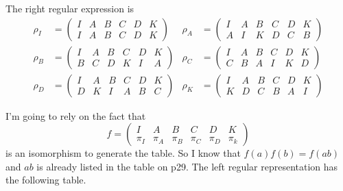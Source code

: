 \documentclass[twoside]{amsart}
\begin{document}
\begin{enumerate}[A.]
\begin{enumerate}[1]
      The right regular expression is
      \begin{align*}
         \rho_I &= 
            \begin{pmatrix}
               I & A & B & C & D & K \\
               I & A & B & C & D & K
            \end{pmatrix} &
         \rho_A &=
            \begin{pmatrix}
               I & A & B & C & D & K \\
               A & I & K & D & C & B
            \end{pmatrix} \\
         \rho_B &= 
            \begin{pmatrix}
               I & A & B & C & D & K \\
               B & C & D & K & I & A
            \end{pmatrix} &
         \rho_C &=
            \begin{pmatrix}
               I & A & B & C & D & K \\
               C & B & A & I & K & D
            \end{pmatrix} \\
         \rho_D &= 
            \begin{pmatrix}
               I & A & B & C & D & K \\
               D & K & I & A & B & C
            \end{pmatrix} &
         \rho_K &=
            \begin{pmatrix}
               I & A & B & C & D & K \\
               K & D & C & B & A & I
            \end{pmatrix} 
      \end{align*}

      I'm going to rely on the fact that
      \[
         f = 
            \begin{pmatrix}
               I     & A     & B     & C     & D     & K \\
               \pi_I & \pi_A & \pi_B & \pi_C & \pi_D & \pi_k
            \end{pmatrix}
      \]
      is an isomorphism to generate the table. So I know that
      $f(a)f(b) = f(ab)$ and $ab$ is already listed in the table on
      p29. The left regular representation has the following table.


\end{enumerate}
\end{enumerate}
\end{document}
